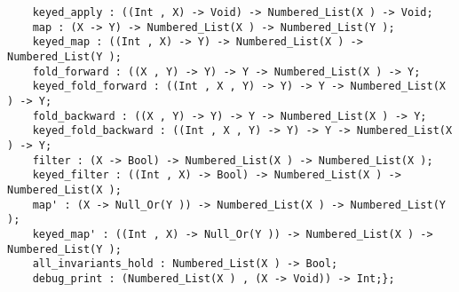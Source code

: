 \begin{verbatim}
    keyed_apply : ((Int , X) -> Void) -> Numbered_List(X ) -> Void;
    map : (X -> Y) -> Numbered_List(X ) -> Numbered_List(Y );
    keyed_map : ((Int , X) -> Y) -> Numbered_List(X ) -> Numbered_List(Y );
    fold_forward : ((X , Y) -> Y) -> Y -> Numbered_List(X ) -> Y;
    keyed_fold_forward : ((Int , X , Y) -> Y) -> Y -> Numbered_List(X ) -> Y;
    fold_backward : ((X , Y) -> Y) -> Y -> Numbered_List(X ) -> Y;
    keyed_fold_backward : ((Int , X , Y) -> Y) -> Y -> Numbered_List(X ) -> Y;
    filter : (X -> Bool) -> Numbered_List(X ) -> Numbered_List(X );
    keyed_filter : ((Int , X) -> Bool) -> Numbered_List(X ) -> Numbered_List(X );
    map' : (X -> Null_Or(Y )) -> Numbered_List(X ) -> Numbered_List(Y );
    keyed_map' : ((Int , X) -> Null_Or(Y )) -> Numbered_List(X ) -> Numbered_List(Y );
    all_invariants_hold : Numbered_List(X ) -> Bool;
    debug_print : (Numbered_List(X ) , (X -> Void)) -> Int;};
\end{verbatim}
\index[fun]{\_[]}
\index[fun]{\$}
